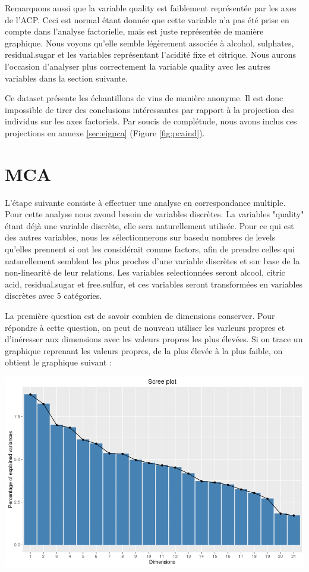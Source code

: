 \documentclass[11pt,a4paper]{article}
\begin{document}
Remarquons aussi que la variable quality est faiblement représentée par les axes de l'ACP. Ceci est normal étant donnée que cette variable n'a pas été prise en compte dans l'analyse factorielle, mais est juste représentée de manière graphique. Nous voyons qu'elle semble légèrement associée à alcohol, sulphates, residual.sugar et les variables représentant l'acidité fixe et citrique. Nous aurons l'occasion d'analyser plus correctement la variable quality avec les autres variables dans la section suivante.

Ce dataset présente les échantillons de vins de manière anonyme. Il est donc impossible de tirer des conclusions intéressantes par rapport à la projection des individus sur les axes factoriels. Par soucis de complétude, nous avons inclus ces projections en annexe \ref{sec:eigpca} (Figure \ref{fig:pcaind}).

\section{MCA}

L'étape suivante consiste à effectuer une analyse en correspondance multiple. Pour cette analyse nous avond besoin de variables discrètes. La variables "quality" étant déjà une variable discrète, elle sera naturellement utilisée. Pour ce qui est des autres variables, nous les sélectionnerons sur basedu nombres de levels qu'elles prennent si ont les considérait comme factors, afin de prendre celles qui naturellement semblent les plus proches d'une variable discrètes et sur base de la non-linearité de leur relations. Les variables selectionnées seront alcool, citric acid, residual.sugar et free.sulfur, et ces variables seront transformées en variables discrètes avec 5 catégories.

La première question est de savoir combien de  dimensions conserver. Pour répondre à cette question, on peut de nouveau utiliser les varleurs propres et d'inéresser aux dimensions avec les valeurs propres les plus élevées. Si on trace un graphique reprenant les valeurs propres, de la plus élevée à la plus faible, on obtient le graphique suivant : 

\begin{center}
\includegraphics[scale=0.4]{"mca-eigen"}
\end{center}
\end{document}
